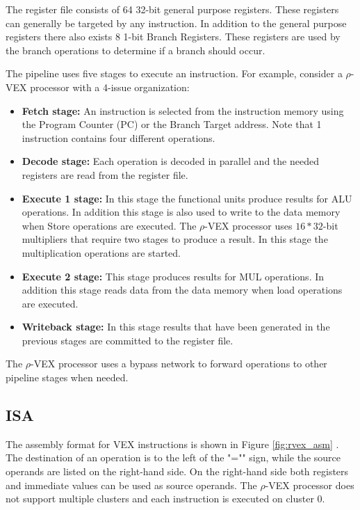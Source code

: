 The register file consists of 64 32-bit general purpose registers. These registers can generally be targeted by any instruction. In addition to the general purpose registers there also exists 8 1-bit Branch Registers. These registers are used by the branch operations to determine if a branch should occur.

The pipeline uses five stages to execute an instruction. For example, consider a $\rho$-VEX processor with a 4-issue organization:

\begin{itemize}
  \item \textbf{Fetch stage:} An instruction is selected from the instruction memory using the Program Counter (PC) or the Branch Target address. Note that 1 instruction contains four different operations.
  \item \textbf{Decode stage:} Each operation is decoded in parallel and the needed registers are read from the register file. 
  \item \textbf{Execute 1 stage:} In this stage the functional units produce results for ALU operations. In addition this stage is also used to write to the data memory when Store operations are executed. The $\rho$-VEX processor uses $16*32$-bit multipliers that require two stages to produce a result. In this stage the multiplication operations are started.
  \item \textbf{Execute 2 stage:} This stage produces results for MUL operations. In addition this stage reads data from the data memory when load operations are executed.
  \item \textbf{Writeback stage:} In this stage results that have been generated in the previous stages are committed to the register file.
\end{itemize}

The $\rho$-VEX processor uses a bypass network to forward operations to other pipeline stages when needed.

\subsection{ISA}
The assembly format for VEX instructions is shown in Figure \ref{fig:rvex_asm} \cite{Joseph-A.-Fisher:2012rm}. The destination of an operation is to the left of the "="" sign, while the source operands are listed on the right-hand side. On the right-hand side both registers and immediate values can be used as source operands. The $\rho$-VEX processor does not support multiple clusters and each instruction is executed on cluster 0.

